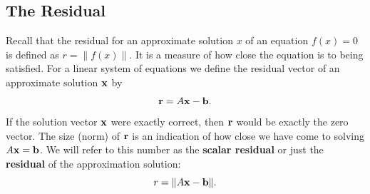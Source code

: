 
\subsection*{The Residual}

Recall that the residual for an approximate solution $x$
of an equation $f(x) =0$ is defined as $r = \|f(x)\|$.
It is a measure of how close the equation is to being satisfied.
For a linear system of equations we define the residual vector
of an approximate solution $\mathbf{x}$ by
\begin{equation*}
\mathbf{r} = A \mathbf{x} - \mathbf{b}.
\end{equation*}
If the solution vector $\mathbf{x}$ were exactly correct, then $\mathbf{r}$ would be 
exactly the zero vector.  The size (norm)  of $\mathbf{r}$ is
an indication of how close we have come to solving
$A \mathbf{x} = \mathbf{b}$. We will refer to this number as the {\bf scalar residual} or just  the {\bf residual} of the
approximation solution:
\begin{equation}
   r = \| A \mathbf{x} - \mathbf{b} \|.
\end{equation}



